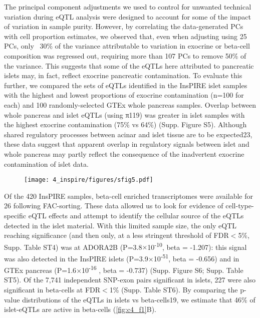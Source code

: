 The principal component adjustments we used to control for unwanted technical variation during eQTL analysis were designed to account for some of the impact of variation in sample purity. However, by correlating the data-generated PCs with cell proportion estimates, we observed that, even when adjusting using 25 PCs, only ~30\% of the variance attributable to variation in exocrine or beta-cell composition was regressed out, requiring more than 107 PCs to remove 50\% of the variance. This suggests that some of the eQTLs here attributed to pancreatic islets may, in fact, reflect exocrine pancreatic contamination. To evaluate this further, we compared the sets of eQTLs identified in the InsPIRE islet samples with the highest and lowest proportions of exocrine contamination (n=100 for each) and 100 randomly-selected GTEx whole pancreas samples. Overlap between whole pancreas and islet eQTLs (using π119) was greater in islet samples with the highest exocrine contamination (75\% vs 64\%) (Supp. Figure S5). Although shared regulatory processes between acinar and islet tissue are to be expected23, these data suggest that apparent overlap in regulatory signals between islet and whole pancreas may partly reflect the consequence of the inadvertent exocrine contamination of islet data. \\

\begin{figure}
    \centering
    \texttt{[image: 4\_inspire/figures/sfig5.pdf]}
    \caption{}
    \label{fig:c4_sf5}
\end{figure}


Of the 420 InsPIRE samples, beta-cell enriched transcriptomes were available for 26 following FAC-sorting. These data allowed us to look for evidence of cell-type-specific eQTL effects and attempt to identify the cellular source of the eQTLs detected in the islet material. With this limited sample size, the only eQTL reaching significance (and then only, at a less stringent threshold of FDR$<$5\%, Supp. Table ST4) was at ADORA2B (P=3.8$\times$10\textsuperscript{-10}, beta = -1.207): this signal was also detected in the InsPIRE islets (P=3.9$\times$10\textsuperscript{-51}, beta = -0.656) and in GTEx pancreas (P=1.6$\times$10\textsuperscript{-16} , beta = -0.737) (Supp. Figure S6; Supp. Table ST5). Of the 7,741 independent SNP-exon pairs significant in islets, 227 were also significant in beta-cells at FDR$<$1\% (Supp. Table ST6). By comparing the p-value distributions of the eQTLs in islets vs beta-cells19, we estimate that 46\% of islet-eQTLs are active in beta-cells (\ref{fig:c4_f1}B). \\
    

